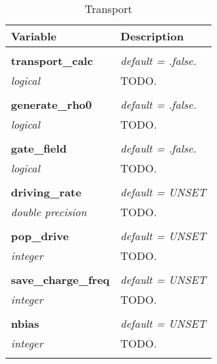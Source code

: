 \begin{Spacing}{1.0}
\begin{longtable}{ p{} p{} }

   \toprule
   \textbf{Variable} & Description \\*
   \midrule \\*
   \endhead

   \bottomrule
   \caption{Transport}
   \endfoot

   \textbf{transport\_calc}
   &  \textit{default = .false. }
   \\*\textit{logical}
   & TODO.\\* \\

   \textbf{generate\_rho0}
   &  \textit{default = .false. }
   \\*\textit{logical}
   & TODO.\\* \\

   \textbf{gate\_field}
   &  \textit{default = .false. }
   \\*\textit{logical}
   & TODO.\\* \\

   \textbf{driving\_rate}
   &  \textit{default = UNSET}
   \\*\textit{double precision}
   & TODO.\\* \\

   \textbf{pop\_drive}
   &  \textit{default = UNSET}
   \\*\textit{integer}
   & TODO.\\* \\

   \textbf{save\_charge\_freq}
   &  \textit{default = UNSET}
   \\*\textit{integer}
   & TODO.\\* \\

   \textbf{nbias}
   &  \textit{default = UNSET}
   \\*\textit{integer}
   & TODO.\\* \\

\end{longtable}
\end{Spacing}
